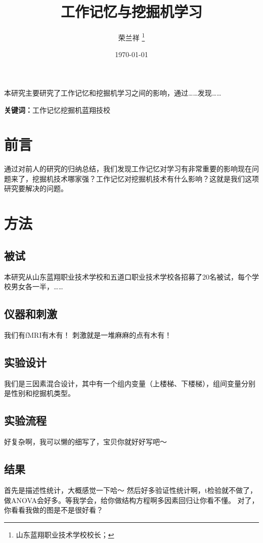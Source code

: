 \documentclass[UTF8,a4paper]{ctexart}
\title{\bfseries 工作记忆与挖掘机学习}
\author{荣兰祥 \thanks{山东蓝翔职业技术学校校长；}}
\date{\today}
\begin{document}
\maketitle


\begin{center}
\parbox{130mm}{
本研究主要研究了工作记忆和挖掘机学习之间的影响，通过……发现……
\par
\vspace{1mm}
{\bfseries 关键词：}工作记忆\quad 挖掘机\quad 蓝翔技校}
\end{center}



\section{前言}
通过对前人的研究的归纳总结，我们发现工作记忆对学习有非常重要的影响现在问题来了，挖掘机技术哪家强？工作记忆对挖掘机技术有什么影响？这就是我们这项研究要解决的问题。

\section{方法}
\subsection{被试}
本研究从山东蓝翔职业技术学校和五道口职业技术学校各招募了20名被试，每个学校男女各一半，……

\subsection{仪器和刺激}
我们有fMRI有木有！
刺激就是一堆麻麻的点有木有！

\subsection{实验设计}
我们是三因素混合设计，其中有一个组内变量（上楼梯、下楼梯），组间变量分别是性别和挖掘机类型。

\subsection{实验流程}
好复杂啊，我可以懒的细写了，宝贝你就好好写吧～

\subsection{结果}
首先是描述性统计，大概感觉一下哈～
然后好多验证性统计啊，t检验就不做了，做ANOVA会好多。等我学会，给你做结构方程啊多因素回归让你看不懂。
对了，你看看我做的图是不是很好看？
\end{document}
